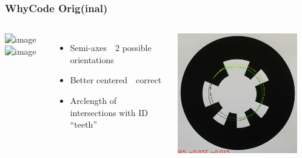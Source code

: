 \documentclass[aspectratio=169]{rubeamer}
\newif\ifpause
\newcommand{\mypause}{\ifpause \pause \fi}
\begin{document}
\begin{frame}
  \frametitle{WhyCode Orig(inal)}
  \begin{columns}
    \includegraphics<1-4>[width=0.9\textwidth]{whycode_layout}\includegraphics<5>[width=0.9\textwidth]{whycode_layout_with_sample_lines}
    \mypause
    \begin{itemize}
      \item Semi-axes~\textrightarrow~2 possible orientations
      \mypause
      \item Better centered~\textrightarrow~correct
      \mypause
      \item Arclength of intersections with ID ``teeth''
    \end{itemize}
    \centering
    \onslide
    \includegraphics[width=0.9\textwidth]{whycode_orig_both_solutions_cropped}
  \end{columns}
\end{frame}
\end{document}
